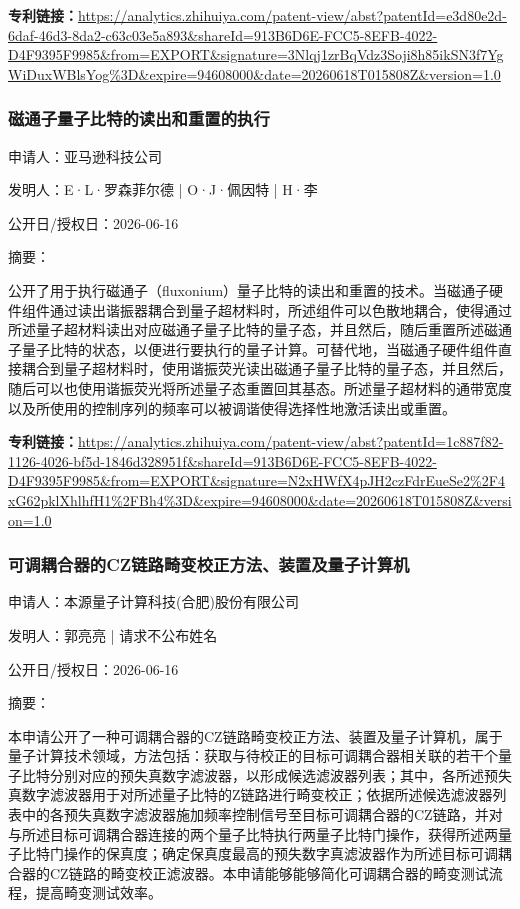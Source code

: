 \documentclass[12pt,a4paper]{ctexart}
\begin{document}
\noindent\textbf{专利链接：}\url{https://analytics.zhihuiya.com/patent-view/abst?patentId=e3d80e2d-6daf-46d3-8da2-c63c03e5a893&shareId=913B6D6E-FCC5-8EFB-4022-D4F9395F9985&from=EXPORT&signature=3Nlqj1zrBqVdz3Soji8h85ikSN3f7YgWiDuxWBlsYog%3D&expire=94608000&date=20260618T015808Z&version=1.0}

\subsubsection{ 磁通子量子比特的读出和重置的执行 }

申请人：亚马逊科技公司

发明人：E·L·罗森菲尔德 | O·J·佩因特 | H·李

公开日/授权日：2026-06-16

摘要：

公开了用于执行磁通子（fluxonium）量子比特的读出和重置的技术。当磁通子硬件组件通过读出谐振器耦合到量子超材料时，所述组件可以色散地耦合，使得通过所述量子超材料读出对应磁通子量子比特的量子态，并且然后，随后重置所述磁通子量子比特的状态，以便进行要执行的量子计算。可替代地，当磁通子硬件组件直接耦合到量子超材料时，使用谐振荧光读出磁通子量子比特的量子态，并且然后，随后可以也使用谐振荧光将所述量子态重置回其基态。所述量子超材料的通带宽度以及所使用的控制序列的频率可以被调谐使得选择性地激活读出或重置。

\noindent\textbf{专利链接：}\url{https://analytics.zhihuiya.com/patent-view/abst?patentId=1c887f82-1126-4026-bf5d-1846d328951f&shareId=913B6D6E-FCC5-8EFB-4022-D4F9395F9985&from=EXPORT&signature=N2xHWfX4pJH2czFdrEueSe2%2F4xG62pklXhlhfH1%2FBh4%3D&expire=94608000&date=20260618T015808Z&version=1.0}

\subsubsection{ 可调耦合器的CZ链路畸变校正方法、装置及量子计算机 }

申请人：本源量子计算科技(合肥)股份有限公司

发明人：郭亮亮 | 请求不公布姓名

公开日/授权日：2026-06-16

摘要：

本申请公开了一种可调耦合器的CZ链路畸变校正方法、装置及量子计算机，属于量子计算技术领域，方法包括：获取与待校正的目标可调耦合器相关联的若干个量子比特分别对应的预失真数字滤波器，以形成候选滤波器列表；其中，各所述预失真数字滤波器用于对所述量子比特的Z链路进行畸变校正；依据所述候选滤波器列表中的各预失真数字滤波器施加频率控制信号至目标可调耦合器的CZ链路，并对与所述目标可调耦合器连接的两个量子比特执行两量子比特门操作，获得所述两量子比特门操作的保真度；确定保真度最高的预失数字真滤波器作为所述目标可调耦合器的CZ链路的畸变校正滤波器。本申请能够能够简化可调耦合器的畸变测试流程，提高畸变测试效率。
\end{document}
